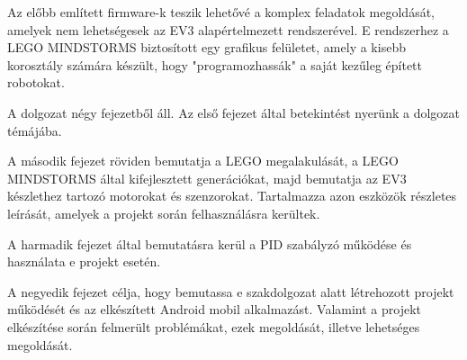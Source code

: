 Az előbb említett firmware-k teszik lehetővé a komplex feladatok megoldását, amelyek nem lehetségesek az EV3 alapértelmezett rendszerével. E rendszerhez a LEGO MINDSTORMS biztosított egy grafikus felületet, amely a kisebb korosztály számára készült, hogy "programozhassák" a saját kezűleg épített robotokat.

A dolgozat négy fejezetből áll. Az első fejezet által betekintést nyerünk a dolgozat témájába. 

A második fejezet röviden bemutatja a LEGO megalakulását, a LEGO MINDSTORMS által kifejlesztett generációkat, majd bemutatja az EV3 készlethez tartozó motorokat és szenzorokat. Tartalmazza azon eszközök részletes leírását, amelyek a projekt során felhasználásra kerültek.

A harmadik fejezet által bemutatásra kerül a PID szabályzó működése és használata e projekt esetén.

A negyedik fejezet célja, hogy bemutassa e szakdolgozat alatt létrehozott projekt működését és az elkészített Android mobil alkalmazást. Valamint a projekt elkészítése során felmerült problémákat, ezek megoldását, illetve lehetséges megoldását.